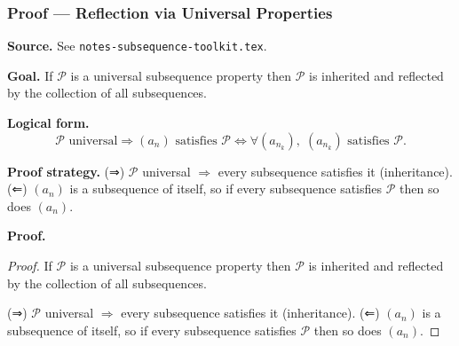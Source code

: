 
\clearpage
{}
\hypertarget{proof-RA-ABB-P-universal-reflection}{}

\subsubsection[Reflection via Universal Properties]{Proof --- Reflection via Universal Properties}

\bigskip

\noindent
\textbf{Source.}
See \texttt{notes-subsequence-toolkit.tex}.

\vspace{0.75em}

\noindent
\textbf{Goal.}
If $\mathcal{P}$ is a universal subsequence property then $\mathcal{P}$ is inherited and reflected by the collection of all subsequences.

\vspace{0.75em}

\noindent
\textbf{Logical form.}
\[
  \mathcal{P} \text{ universal} \Rightarrow (a_n) \text{ satisfies } \mathcal{P} \Leftrightarrow \forall (a_{n_k}),\; (a_{n_k}) \text{ satisfies } \mathcal{P}.
\]

\vspace{0.75em}

\noindent
\textbf{Proof strategy.}
(⇒) $\mathcal{P}$ universal $\Rightarrow$ every subsequence satisfies it (inheritance). (⇐) $(a_n)$ is a subsequence of itself, so if every subsequence satisfies $\mathcal{P}$ then so does $(a_n)$.

\vspace{0.75em}

\noindent
\textbf{Proof.}
\begin{proof}
\Claim If $\mathcal{P}$ is a universal subsequence property then $\mathcal{P}$ is inherited and reflected by the collection of all subsequences.

\Given 

\Goal 

\Strategy (⇒) $\mathcal{P}$ universal $\Rightarrow$ every subsequence satisfies it (inheritance). (⇐) $(a_n)$ is a subsequence of itself, so if every subsequence satisfies $\mathcal{P}$ then so does $(a_n)$.

\medskip


\end{proof}

